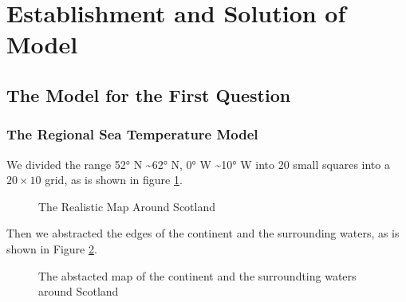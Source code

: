 \documentclass{mcmthesis}
\numberwithin{figure}{section}
\numberwithin{table}{section}
\begin{document}
\section{Establishment and Solution of Model}
\subsection{The Model for the First Question}
\subsubsection{The Regional Sea Temperature Model}
We divided the range \ang{52} N \textasciitilde \ang{62} N, \ang{0} W \textasciitilde \ang{10} W into 20 small squares into a $20 \times 10$ grid, as is shown in figure \ref{RealMap}.


\begin{figure}[H]
  \caption{The Realistic Map Around Scotland}\label{RealMap}
\end{figure}

Then we abstracted the edges of the continent and the surrounding waters, as is shown in Figure \ref{AbstractMap}.
\begin{figure}[H]
  \caption{The abstacted map of the continent and the surroundting waters around Scotland}\label{AbstractMap}
\end{figure}
\end{document}
